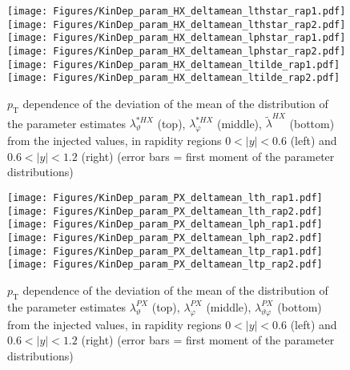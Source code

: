 \documentclass[12pt]{article}
\newcommand{\pT}{p_\mathrm{T}}
\newcommand{\absy}{\left |  y \right |}
\newcommand{\lamtildeHX}{\tilde{\lambda}^{\scriptscriptstyle HX}}
\newcommand{\lamthstarHX}{\lambda^{* \scriptscriptstyle HX}_\vartheta}
\newcommand{\lamphstarHX}{\lambda^{* \scriptscriptstyle HX}_\varphi}
\newcommand{\lamthPX}{\lambda^{\scriptscriptstyle PX}_\vartheta}
\newcommand{\lamphPX}{\lambda^{\scriptscriptstyle PX}_\varphi}
\newcommand{\lamthphPX}{\lambda^{\scriptscriptstyle PX}_{\vartheta \varphi}}
\begin{document}
\begin{figure}[htbp]
\centering
\texttt{[image: Figures/KinDep\_param\_HX\_deltamean\_lthstar\_rap1.pdf]}
\texttt{[image: Figures/KinDep\_param\_HX\_deltamean\_lthstar\_rap2.pdf]}
\texttt{[image: Figures/KinDep\_param\_HX\_deltamean\_lphstar\_rap1.pdf]}
\texttt{[image: Figures/KinDep\_param\_HX\_deltamean\_lphstar\_rap2.pdf]}
\texttt{[image: Figures/KinDep\_param\_HX\_deltamean\_ltilde\_rap1.pdf]}
\texttt{[image: Figures/KinDep\_param\_HX\_deltamean\_ltilde\_rap2.pdf]}
\caption{$\pT$ dependence of the deviation of the mean of the distribution of
the parameter estimates $\lamthstarHX$ (top), $\lamphstarHX$ (middle),
$\lamtildeHX$ (bottom) from the injected values, in rapidity regions
$0<\absy<0.6$ (left) and $0.6<\absy<1.2$ (right) (error bars = first moment of
the parameter distributions)}
\end{figure}
\clearpage











\begin{figure}[htbp]
\centering
\texttt{[image: Figures/KinDep\_param\_PX\_deltamean\_lth\_rap1.pdf]}
\texttt{[image: Figures/KinDep\_param\_PX\_deltamean\_lth\_rap2.pdf]}
\texttt{[image: Figures/KinDep\_param\_PX\_deltamean\_lph\_rap1.pdf]}
\texttt{[image: Figures/KinDep\_param\_PX\_deltamean\_lph\_rap2.pdf]}
\texttt{[image: Figures/KinDep\_param\_PX\_deltamean\_ltp\_rap1.pdf]}
\texttt{[image: Figures/KinDep\_param\_PX\_deltamean\_ltp\_rap2.pdf]}
\caption{$\pT$ dependence of the deviation of the mean of the distribution of
the parameter estimates $\lamthPX$ (top), $\lamphPX$ (middle), $\lamthphPX$
(bottom) from the injected values, in rapidity regions $0<\absy<0.6$ (left) and
$0.6<\absy<1.2$ (right) (error bars = first moment of the parameter
distributions)}
\end{figure}
\clearpage
\end{document}
